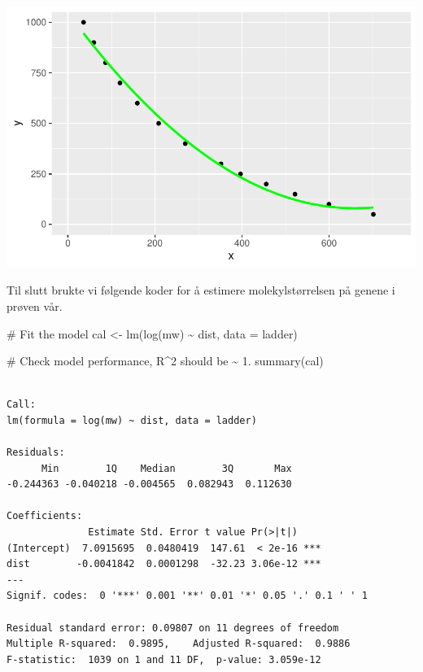\documentclass[
  letterpaper,
  DIV=11,
  numbers=noendperiod]{scrartcl}
\newenvironment{Shaded}{\begin{snugshade}}{\end{snugshade}}
\newcommand{\AttributeTok}[1]{\textcolor[rgb]{0.40,0.45,0.13}{#1}}
\newcommand{\CommentTok}[1]{\textcolor[rgb]{0.37,0.37,0.37}{#1}}
\newcommand{\FunctionTok}[1]{\textcolor[rgb]{0.28,0.35,0.67}{#1}}
\newcommand{\NormalTok}[1]{\textcolor[rgb]{0.00,0.23,0.31}{#1}}
\newcommand{\OtherTok}[1]{\textcolor[rgb]{0.00,0.23,0.31}{#1}}
\newcommand{\SpecialCharTok}[1]{\textcolor[rgb]{0.37,0.37,0.37}{#1}}
\begin{document}
\includegraphics{02-regression-models_files/figure-pdf/unnamed-chunk-6-1.pdf}

Til slutt brukte vi følgende koder for å estimere molekylstørrelsen på
genene i prøven vår.

\begin{Shaded}
\begin{Highlighting}[]
\CommentTok{\# Fit the model}
\NormalTok{cal }\OtherTok{\textless{}{-}} \FunctionTok{lm}\NormalTok{(}\FunctionTok{log}\NormalTok{(mw) }\SpecialCharTok{\textasciitilde{}}\NormalTok{ dist, }\AttributeTok{data =}\NormalTok{ ladder)}

\CommentTok{\# Check model performance, R\^{}2 should be \textasciitilde{} 1.}
\FunctionTok{summary}\NormalTok{(cal)}
\end{Highlighting}
\end{Shaded}

\begin{verbatim}

Call:
lm(formula = log(mw) ~ dist, data = ladder)

Residuals:
      Min        1Q    Median        3Q       Max 
-0.244363 -0.040218 -0.004565  0.082943  0.112630 

Coefficients:
              Estimate Std. Error t value Pr(>|t|)    
(Intercept)  7.0915695  0.0480419  147.61  < 2e-16 ***
dist        -0.0041842  0.0001298  -32.23 3.06e-12 ***
---
Signif. codes:  0 '***' 0.001 '**' 0.01 '*' 0.05 '.' 0.1 ' ' 1

Residual standard error: 0.09807 on 11 degrees of freedom
Multiple R-squared:  0.9895,    Adjusted R-squared:  0.9886 
F-statistic:  1039 on 1 and 11 DF,  p-value: 3.059e-12
\end{verbatim}
\end{document}
